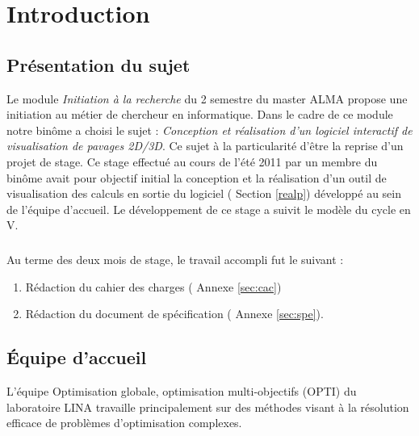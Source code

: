 \chapter{Introduction}

\section{Présentation du sujet}
Le module \emph{Initiation à la recherche} du 2 semestre du master \textsc{ALMA} propose une initiation au métier de chercheur en informatique. Dans le cadre de ce module notre binôme a choisi le sujet : \emph{Conception et réalisation d’un logiciel interactif de visualisation de pavages 2D/3D}. Ce sujet à la particularité d'être la reprise d'un projet de stage. Ce stage effectué au cours de l'été 2011 par un membre du binôme avait pour objectif initial la conception et la réalisation d'un outil de visualisation des calculs en sortie du logiciel \realpaver (\cf{} Section \ref{realp}) développé au sein de l'équipe d'accueil. Le développement de ce stage a suivit le modèle du cycle en V.

\paragraph{}
Au terme des deux mois de stage, le travail accompli fut le suivant :
\begin{enumerate}
\item 
Rédaction du cahier des charges (\cf{} Annexe \ref{sec:cac})
\item
Rédaction du document de spécification (\cf{} Annexe \ref{sec:spe}).
\end{enumerate} 



\section{\'Equipe d'accueil}
L'équipe Optimisation globale, optimisation multi-objectifs\cite{opti} (\textsc{OPTI}) du laboratoire \textsc{LINA}\cite{lina} travaille principalement sur des méthodes visant à la résolution efficace de problèmes d’optimisation complexes.  

